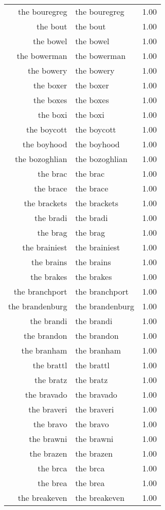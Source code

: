 \begin{table}[ht]
\begin{tabular}{rlr}
  the bouregreg & the bouregreg & 1.00 \\ 
  the bout & the bout & 1.00 \\ 
  the bowel & the bowel & 1.00 \\ 
  the bowerman & the bowerman & 1.00 \\ 
  the bowery & the bowery & 1.00 \\ 
  the boxer & the boxer & 1.00 \\ 
  the boxes & the boxes & 1.00 \\ 
  the boxi & the boxi & 1.00 \\ 
  the boycott & the boycott & 1.00 \\ 
  the boyhood & the boyhood & 1.00 \\ 
  the bozoghlian & the bozoghlian & 1.00 \\ 
  the brac & the brac & 1.00 \\ 
  the brace & the brace & 1.00 \\ 
  the brackets & the brackets & 1.00 \\ 
  the bradi & the bradi & 1.00 \\ 
  the brag & the brag & 1.00 \\ 
  the brainiest & the brainiest & 1.00 \\ 
  the brains & the brains & 1.00 \\ 
  the brakes & the brakes & 1.00 \\ 
  the branchport & the branchport & 1.00 \\ 
  the brandenburg & the brandenburg & 1.00 \\ 
  the brandi & the brandi & 1.00 \\ 
  the brandon & the brandon & 1.00 \\ 
  the branham & the branham & 1.00 \\ 
  the brattl & the brattl & 1.00 \\ 
  the bratz & the bratz & 1.00 \\ 
  the bravado & the bravado & 1.00 \\ 
  the braveri & the braveri & 1.00 \\ 
  the bravo & the bravo & 1.00 \\ 
  the brawni & the brawni & 1.00 \\ 
  the brazen & the brazen & 1.00 \\ 
  the brca & the brca & 1.00 \\ 
  the brea & the brea & 1.00 \\ 
  the breakeven & the breakeven & 1.00 \\ 

\end{tabular}
\end{table}
